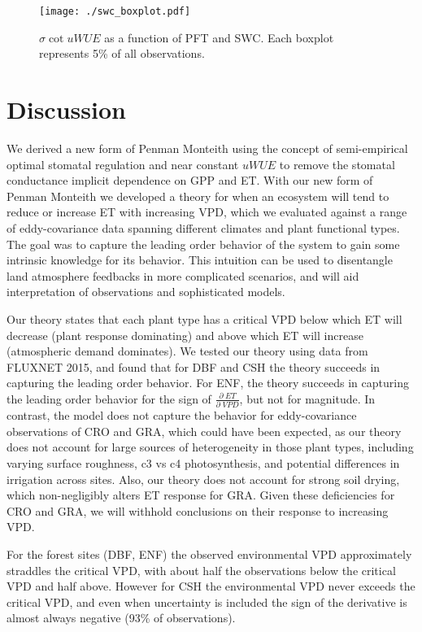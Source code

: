 \documentclass[draft,linenumbers]{gcbjournal}
\begin{document}
\begin{figure}[!p]
\centering
\texttt{[image: ./swc\_boxplot.pdf]}
\caption{$\sigma \cot uWUE$ as a function of PFT and SWC. Each boxplot represents 5\% of all observations.}
\label{swc}
\end{figure}

\section{Discussion} 

We derived a new form of Penman Monteith using the concept of semi-empirical optimal stomatal regulation \citep{Lin_2015, MEDLYN_2011} and near constant $uWUE$ \citep{Zhou_2015} to remove the stomatal conductance implicit dependence on GPP and ET. With our new form of Penman Monteith we developed a theory for when an ecosystem will tend to reduce or increase ET with increasing VPD, which we evaluated against a range of eddy-covariance data spanning different climates and plant functional types. The goal was to capture the leading order behavior of the system to gain some intrinsic knowledge for its behavior. This intuition can be used to disentangle land atmosphere feedbacks in more complicated scenarios, and will aid interpretation of observations and sophisticated models.

Our theory states that each plant type has a critical VPD below which ET will decrease (plant response dominating) and above which ET will increase (atmospheric demand dominates). We tested our theory using data from FLUXNET 2015, and found that for DBF and CSH the theory succeeds in capturing the leading order behavior. For ENF, the theory succeeds in capturing the leading order behavior for the sign of $\frac{\partial \; ET}{\partial \; VPD}$, but not for magnitude. In contrast, the model does not capture the behavior for eddy-covariance observations of CRO and GRA, which could have been expected, as our theory does not account for large sources of heterogeneity in those plant types, including varying surface roughness, c3 vs c4 photosynthesis, and potential differences in irrigation across sites. Also, our theory does not account for strong soil drying, which non-negligibly alters ET response for GRA. Given these deficiencies for CRO and GRA, we will withhold conclusions on their response to increasing VPD.

For the forest sites (DBF, ENF) the observed environmental VPD approximately straddles the critical VPD, with about half the observations below the critical VPD and half above. However for CSH the environmental VPD never exceeds the critical VPD, and even when uncertainty is included the sign of the derivative is almost always negative (93\% of observations).
\end{document}
